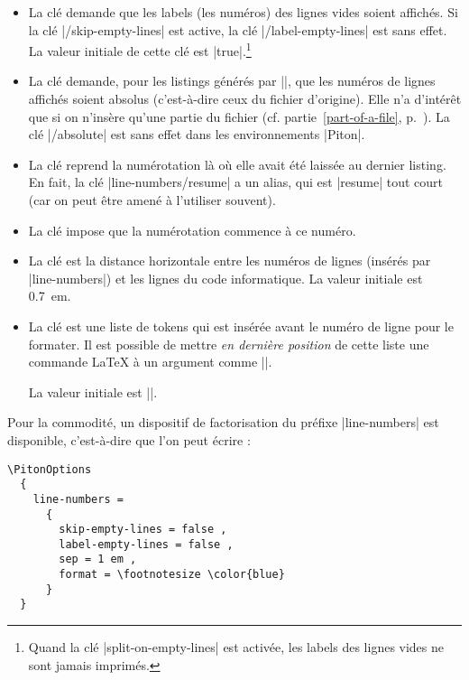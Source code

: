 \documentclass[dvipsnames,svgnames]{article}
\begin{document}
\begin{itemize}
\begin{Piton}
\begin{itemize}
\item La clé  demande que les labels
(les numéros) des lignes vides soient affichés. Si la clé |/skip-empty-lines|
est active, la clé |/label-empty-lines| est sans effet. La valeur initiale de
cette clé est |true|.\footnote{Quand la clé |split-on-empty-lines| est activée,
  les labels des lignes vides ne sont jamais imprimés.}

\item La clé  demande, pour les listings
générés par |\PitonInputFile|, que les numéros de lignes affichés soient absolus
(c'est-à-dire ceux du fichier d'origine). Elle n'a d'intérêt que si on n'insère
qu'une partie du fichier (cf. partie~\ref{part-of-a-file},
p.~\pageref{part-of-a-file}). La clé |/absolute| est sans effet dans les
environnements |{Piton}|.

\item La clé  reprend la numérotation là où elle
avait été laissée au dernier listing. En fait, la clé |line-numbers/resume| a un
alias, qui est |resume| tout court (car on peut être amené à l'utiliser
souvent).

\item La clé  impose que la numérotation commence
à ce numéro.

\item La clé  est la distance horizontale entre les
numéros de lignes (insérés par |line-numbers|) et les lignes du code
informatique. La valeur initiale est 0.7~em.

\item La clé  est une liste de tokens qui est
insérée avant le numéro de ligne pour le formater. Il est possible de mettre
\emph{en dernière position} de cette liste une commande LaTeX à un argument
comme |\fbox|.

La valeur initiale est |\footnotesize \color{gray}|.
\end{itemize}

Pour la commodité, un dispositif de factorisation du préfixe |line-numbers| est
disponible, c'est-à-dire que l'on peut écrire :

\begin{Verbatim}
\PitonOptions
  {
    line-numbers = 
      { 
        skip-empty-lines = false ,
        label-empty-lines = false ,
        sep = 1 em ,
        format = \footnotesize \color{blue}
      }
  }
\end{Verbatim}



\end{Piton}
\end{itemize}
\end{document}
